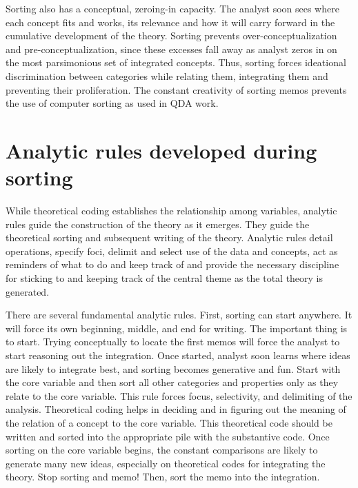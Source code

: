 Sorting also has a conceptual, zeroing-in capacity. 
The analyst soon sees where each concept fits and works, 
its relevance and how it will carry forward in the cumulative development of the theory. 
Sorting prevents over-conceptualization and pre-conceptualization, 
since these excesses fall away as analyst zeros in on the most parsimonious set of integrated concepts. 
Thus, sorting forces ideational discrimination between categories while relating them, 
integrating them and preventing their proliferation. 
The constant creativity of sorting memos prevents the use of computer sorting as used in QDA work.

\section*{Analytic rules developed during sorting}

While theoretical coding establishes the relationship among variables, analytic rules guide the construction of the theory as it emerges. 
They guide the theoretical sorting and subsequent writing of the theory. 
Analytic rules detail operations, 
specify foci, 
delimit and select use of the data and concepts, 
act as reminders of what to do and keep track of and provide the necessary discipline for sticking to and keeping track of the central theme as the total theory is generated.

There are several fundamental analytic rules. 
First, sorting can start anywhere. 
It will force its own beginning, middle, and end for writing. 
The important thing is to start. 
Trying conceptually to locate the first memos will force the analyst to start reasoning out the integration. 
Once started, 
analyst soon learns where ideas are likely to integrate best, and sorting becomes generative and fun. 
Start with the core variable and then sort all other categories and properties only as they relate to the core variable. 
This rule forces focus, selectivity, and delimiting of the analysis. 
Theoretical coding helps in deciding and in figuring out the meaning of
the relation of a concept to the core variable. 
This theoretical code should be written and sorted into the appropriate pile with the substantive code. 
Once sorting on the core variable begins, 
the constant comparisons are likely to generate many new ideas,
especially on theoretical codes for integrating the theory. 
Stop sorting and memo! 
Then, sort the memo into the integration.

